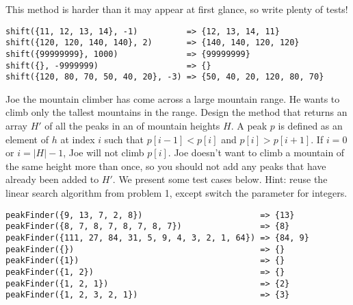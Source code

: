 This method is harder than it may appear at first glance, so write plenty of tests!
\par{
\begin{verbatim}
shift({11, 12, 13, 14}, -1)          => {12, 13, 14, 11}
shift({120, 120, 140, 140}, 2)       => {140, 140, 120, 120}
shift({99999999}, 1000)              => {99999999}
shift({}, -9999999)                  => {}
shift({120, 80, 70, 50, 40, 20}, -3) => {50, 40, 20, 120, 80, 70}
\end{verbatim}
}


Joe the mountain climber has come across a large mountain range. He wants to climb only the tallest mountains in the range. Design the  method that returns an array $H'$ of all the peaks in an  of mountain heights $H$. A peak $p$ is defined as an element of $h$ at index $i$ such that $p[i - 1] < p[i]$ and $p[i] > p[i + 1]$. If $i = 0$ or $i = |H| - 1$, Joe will not climb $p[i]$. Joe doesn't want to climb a mountain of the same height more than once, so you should not add any peaks that have already been added to $H'$. We present some test cases below. Hint: reuse the linear search algorithm from problem 1, except switch the  parameter for integers.

\par{
\begin{verbatim}
peakFinder({9, 13, 7, 2, 8})                        => {13}
peakFinder({8, 7, 8, 7, 8, 7, 8, 7})                => {8}
peakFinder({111, 27, 84, 31, 5, 9, 4, 3, 2, 1, 64}) => {84, 9}
peakFinder({})                                      => {}
peakFinder({1})                                     => {}
peakFinder({1, 2})                                  => {}
peakFinder({1, 2, 1})                               => {2}
peakFinder({1, 2, 3, 2, 1})                         => {3}
\end{verbatim}
}


